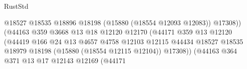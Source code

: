 \begin{lexlean}{RustStd}
\begin{coremodule}
                                                          @18527
                                                          @18535
                                                          @18896
                                                          @18198
                                                          (@15880 (@18554 @12093 @12083))
                                                          @17308))
                                                      (@44163
                                                        @359
                                                        @3668
                                                        @13
                                                        @18
                                                        @12120
                                                        @12170
                                                        (@44171
                                                          @359
                                                          @13
                                                          @12120
                                                          (@44419
                                                            @166
                                                            @24
                                                            @13
                                                            @4657
                                                            @4758
                                                            @12103
                                                            @12115
                                                            @44434
                                                            @18527
                                                            @18535
                                                            @18979
                                                            @18198
                                                            (@15880 (@18554 @12115 @12104))
                                                            @17308))
                                                        (@44163
                                                          @364
                                                          @371
                                                          @13
                                                          @17
                                                          @12143
                                                          @12169
                                                          (@44171

\end{coremodule}
\end{lexlean}
